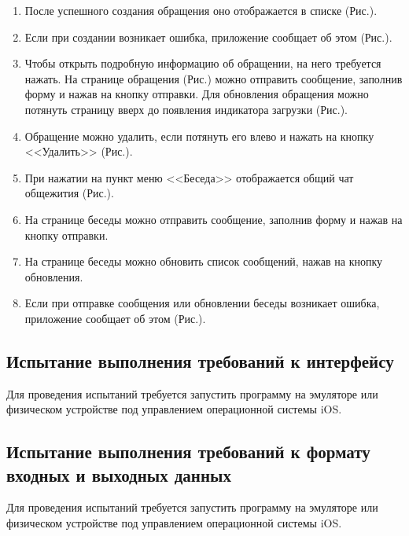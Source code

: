 \documentclass{../includes/TechDoc}
\begin{document}
\begin{enumerate}
        \item После успешного создания обращения оно отображается в списке (Рис.).

        \item Если при создании возникает ошибка, приложение сообщает об этом (Рис.).

        \item Чтобы открыть подробную информацию об обращении, на него требуется нажать.
        На странице обращения (Рис.) можно отправить сообщение, заполнив форму и нажав на кнопку отправки.
        Для обновления обращения можно потянуть страницу вверх до появления индикатора загрузки (Рис.).

        \item Обращение можно удалить, если потянуть его влево и нажать на кнопку <<Удалить>> (Рис.).

        \item При нажатии на пункт меню <<Беседа>> отображается общий чат общежития (Рис.).

        \item На странице беседы можно отправить сообщение, заполнив форму и нажав на кнопку отправки.

        \item На странице беседы можно обновить список сообщений, нажав на кнопку обновления.

        \item Если при отправке сообщения или обновлении беседы возникает ошибка, приложение сообщает об этом (Рис.).
    \end{enumerate}

    \subsection{Испытание выполнения требований к интерфейсу}

    Для проведения испытаний требуется запустить программу на эмуляторе или физическом устройстве под управлением операционной системы iOS\@.

    \subsection{Испытание выполнения требований к формату входных и выходных данных}

    Для проведения испытаний требуется запустить программу на эмуляторе или физическом устройстве под управлением операционной системы iOS\@.
\end{document}

